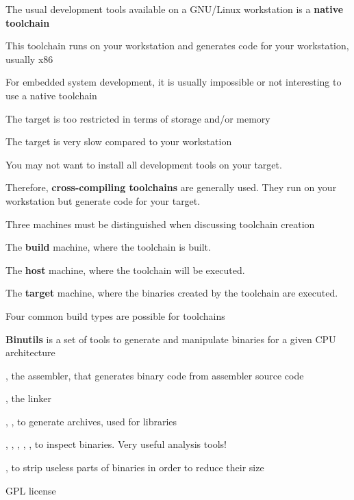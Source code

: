   \startitemize
  \item The usual development tools available on a GNU/Linux
    workstation is a {\bf native toolchain}
  \item This toolchain runs on your workstation and generates code for
    your workstation, usually x86
  \item For embedded system development, it is usually impossible or not
    interesting to use a native toolchain
    \startitemize
    \item The target is too restricted in terms of storage and/or memory
    \item The target is very slow compared to your workstation
    \item You may not want to install all development tools on your target.
    \stopitemize
  \item Therefore, {\bf cross-compiling toolchains} are generally
    used. They run on your workstation but generate code for your
    target.
  \stopitemize


  \startitemize
  \item Three machines must be distinguished when discussing toolchain creation
    \startitemize
    \item The {\bf build} machine, where the toolchain is built.
    \item The {\bf host} machine, where the toolchain will be executed.
    \item The {\bf target} machine, where the binaries created by the
      toolchain are executed.
    \stopitemize
  \item Four common build types are possible for toolchains
  \stopitemize



  \startitemize
  \item {\bf Binutils} is a set of tools to generate and manipulate
    binaries for a given CPU architecture
    \startitemize
    \item {}, the assembler, that generates binary code from
      assembler source code
    \item {}, the linker
    \item {}, , to generate  archives,
      used for libraries
    \item {}, , , ,
      , to inspect binaries. Very useful analysis tools!
    \item {}, to strip useless parts of binaries in order to
      reduce their size
    \stopitemize
  \item {}
  \item GPL license
  \stopitemize

